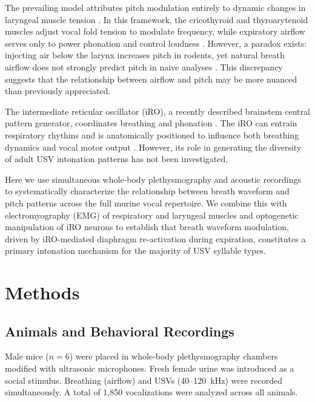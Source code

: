 \documentclass[11pt]{article}
\begin{document}
The prevailing model attributes pitch modulation entirely to dynamic changes in laryngeal muscle tension \citep{riede2011subglottal, riede2017mechanisms}. In this framework, the cricothyroid and thyroarytenoid muscles adjust vocal fold tension to modulate frequency, while expiratory airflow serves only to power phonation and control loudness \citep{titze1988regulation, alipour2002pressure}. However, a paradox exists: injecting air below the larynx increases pitch in rodents, yet natural breath airflow does not strongly predict pitch in naive analyses \citep{riede2011subglottal}. This discrepancy suggests that the relationship between airflow and pitch may be more nuanced than previously appreciated.

The intermediate reticular oscillator (iRO), a recently described brainstem central pattern generator, coordinates breathing and phonation \citep{delpouve2023intermediate, wei2022neural}. The iRO can entrain respiratory rhythms and is anatomically positioned to influence both breathing dynamics and vocal motor output \citep{castellucci2018evidence, smith2013brainstem, feldman2013understanding}. However, its role in generating the diversity of adult USV intonation patterns has not been investigated.

Here we use simultaneous whole-body plethysmography and acoustic recordings to systematically characterize the relationship between breath waveform and pitch patterns across the full murine vocal repertoire. We combine this with electromyography (EMG) of respiratory and laryngeal muscles and optogenetic manipulation of iRO neurons to establish that breath waveform modulation, driven by iRO-mediated diaphragm re-activation during expiration, constitutes a primary intonation mechanism for the majority of USV syllable types.

\section{Methods}

\subsection{Animals and Behavioral Recordings}

Male mice ($n = 6$) were placed in whole-body plethysmography chambers modified with ultrasonic microphones. Fresh female urine was introduced as a social stimulus. Breathing (airflow) and USVs (40--120~kHz) were recorded simultaneously. A total of 1,850 vocalizations were analyzed across all animals.
\end{document}
